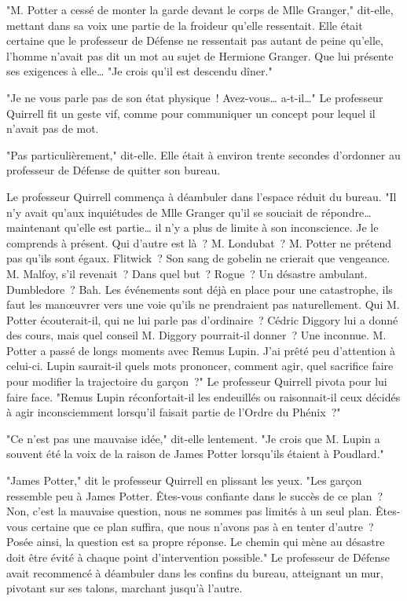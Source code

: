 "M. Potter a cessé de monter la garde devant le corps de Mlle Granger," dit-elle, mettant dans sa voix une partie de la froideur qu'elle ressentait. Elle était certaine que le professeur de Défense ne ressentait pas autant de peine qu'elle, l'homme n'avait pas dit un mot au sujet de Hermione Granger. Que lui présente ses exigences à elle… "Je crois qu'il est descendu dîner."

"Je ne vous parle pas de son état physique~! Avez-vous… a-t-il…" Le professeur Quirrell fit un geste vif, comme pour communiquer un concept pour lequel il n'avait pas de mot.

"Pas particulièrement," dit-elle. Elle était à environ trente secondes d'ordonner au professeur de Défense de quitter son bureau.

Le professeur Quirrell commença à déambuler dans l'espace réduit du bureau. "Il n'y avait qu'aux inquiétudes de Mlle Granger qu'il se souciait de répondre… maintenant qu'elle est partie… il n'y a plus de limite à son inconscience. Je le comprends à présent. Qui d'autre est là~? M. Londubat~? M. Potter ne prétend pas qu'ils sont égaux. Flitwick~? Son sang de gobelin ne crierait que vengeance. M. Malfoy, s'il revenait~? Dans quel but~? Rogue~? Un désastre ambulant. Dumbledore~? Bah. Les événements sont déjà en place pour une catastrophe, ils faut les manœuvrer vers une voie qu'ils ne prendraient pas naturellement. Qui M. Potter écouterait-il, qui ne lui parle pas d'ordinaire~? Cédric Diggory lui a donné des cours, mais quel conseil M. Diggory pourrait-il donner~? Une inconnue. M. Potter a passé de longs moments avec Remus Lupin. J'ai prêté peu d'attention à celui-ci. Lupin saurait-il quels mots prononcer, comment agir, quel sacrifice faire pour modifier la trajectoire du garçon~?" Le professeur Quirrell pivota pour lui faire face. "Remus Lupin réconfortait-il les endeuillés ou raisonnait-il ceux décidés à agir inconsciemment lorsqu'il faisait partie de l'Ordre du Phénix~?"

"Ce n'est pas une mauvaise idée," dit-elle lentement. "Je crois que M. Lupin a souvent été la voix de la raison de James Potter lorsqu'ils étaient à Poudlard."

"James Potter," dit le professeur Quirrell en plissant les yeux. "Les garçon ressemble peu à James Potter. Êtes-vous confiante dans le succès de ce plan~? Non, c'est la mauvaise question, nous ne sommes pas limités à un seul plan. Êtes-vous certaine que ce plan suffira, que nous n'avons pas à en tenter d'autre~? Posée ainsi, la question est sa propre réponse. Le chemin qui mène au désastre doit être évité à chaque point d'intervention possible." Le professeur de Défense avait recommencé à déambuler dans les confins du bureau, atteignant un mur, pivotant sur ses talons, marchant jusqu'à l'autre.

